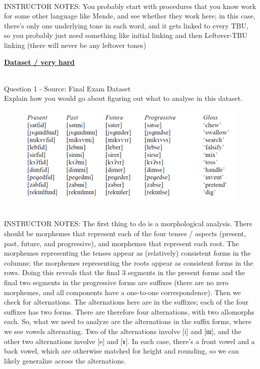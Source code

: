 \documentclass[12pt]{article}
\begin{document}
~\\
INSTRUCTOR NOTES: You probably start with procedures that you know work for some other language like Mende, and see whether they work here; in this case, there's only one underlying tone in each word, and it gets linked to every TBU, so you probably just need something like initial linking and then Leftover-TBU linking (there will never be any leftover tones)


\newpage\textbf{\underline{\huge Dataset / very hard\\}}

~\\

{\large Question 1} - Source: Final Exam Dataset\\

Explain how you would go about figuring out what to analyse in this dataset.\\

\begin{figure}[H]
\includegraphics{../images/final_dataset.png}
\end{figure}

~\\
INSTRUCTOR NOTES: The first thing to do is a morphological analysis. There should be morphemes that represent each of the four tenses / aspects (present, past, future, and progressive), and morphemes that represent each root. The morphemes representing the tenses appear as (relatively) consistent forms in the columns; the morphemes representing the roots appear as consistent forms in the rows. Doing this reveals that the final 3 segments in the present forms and the final two segments in the progressive forms are suffixes (there are no zero morphemes, and all components have a one-to-one correspondence). Then we check for alternations. The alternations here are in the suffixes; each of the four suffixes has two forms. There are therefore four alternations, with two allomorphs each. So, what we need to analyze are the alternations in the suffix forms, where we see vowels alternating. Two of the alternations involve [i] and [ɯ], and the other two alternations involve [e] and [ɤ]. In each case, there’s a front vowel and a back vowel, which are otherwise matched for height and rounding, so we can likely generalize across the alternations.
\end{document}
